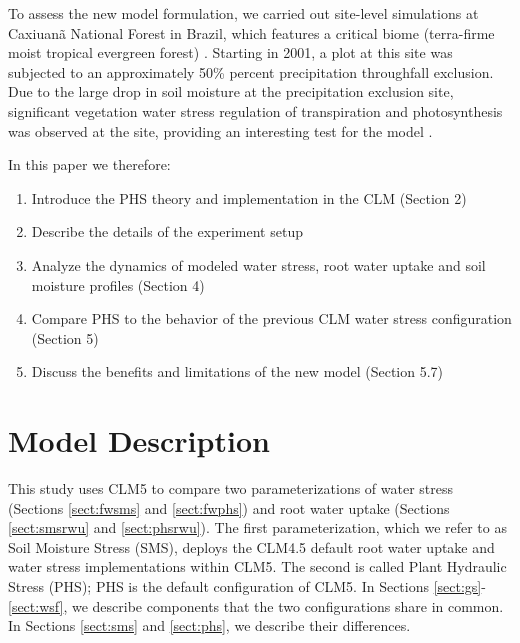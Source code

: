 \documentclass[draft,linenumbers]{agujournal}
\begin{document}
To assess the new model formulation, we carried out site-level simulations at Caxiuan\~a National Forest in Brazil, which features a critical biome (terra-firme moist tropical evergreen forest) \citep{fisher2006}. Starting in 2001, a plot at this site was subjected to an approximately 50\% percent precipitation throughfall exclusion. Due to the large drop in soil moisture at the precipitation exclusion site, significant vegetation water stress regulation of transpiration and photosynthesis was observed at the site, providing an interesting test for the model \citep{fisher2007}.

In this paper we therefore:
\begin{enumerate}
\item Introduce the PHS theory and implementation in the CLM (Section 2)
\item Describe the details of the experiment setup
\item Analyze the dynamics of modeled water stress, root water uptake and soil moisture profiles (Section 4)
\item Compare PHS to the behavior of the previous CLM water stress configuration (Section 5)
\item Discuss the benefits and limitations of the new model (Section 5.7)
\end{enumerate}

\section{Model Description}
This study uses CLM5 to compare two parameterizations of water stress (Sections \ref{sect:fwsms} and \ref{sect:fwphs}) and root water uptake (Sections \ref{sect:smsrwu} and \ref{sect:phsrwu}). The first parameterization, which we refer to as Soil Moisture Stress (SMS), deploys the CLM4.5 default root water uptake and water stress implementations within CLM5. The second is called Plant Hydraulic Stress (PHS); PHS is the default configuration of CLM5. In Sections \ref{sect:gs}-\ref{sect:wsf}, we describe components that the two configurations share in common. In Sections \ref{sect:sms} and \ref{sect:phs}, we describe their differences.
    
    
\end{document}
